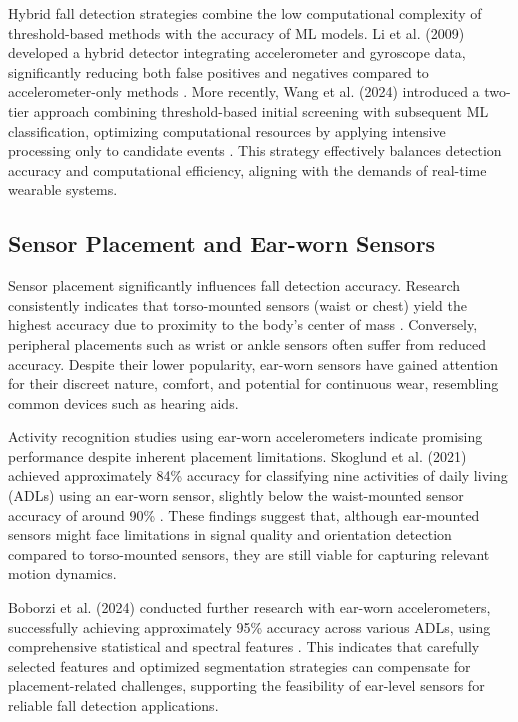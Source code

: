 \documentclass[conference]{IEEEtran}
\begin{document}
Hybrid fall detection strategies combine the low computational complexity of threshold-based methods with the accuracy of ML models. Li et al. (2009) developed a hybrid detector integrating accelerometer and gyroscope data, significantly reducing both false positives and negatives compared to accelerometer-only methods \cite{4}. More recently, Wang et al. (2024) introduced a two-tier approach combining threshold-based initial screening with subsequent ML classification, optimizing computational resources by applying intensive processing only to candidate events \cite{5}. This strategy effectively balances detection accuracy and computational efficiency, aligning with the demands of real-time wearable systems.

\subsection{Sensor Placement and Ear-worn Sensors}

Sensor placement significantly influences fall detection accuracy. Research consistently indicates that torso-mounted sensors (waist or chest) yield the highest accuracy due to proximity to the body's center of mass \cite{8}. Conversely, peripheral placements such as wrist or ankle sensors often suffer from reduced accuracy. Despite their lower popularity, ear-worn sensors have gained attention for their discreet nature, comfort, and potential for continuous wear, resembling common devices such as hearing aids.

Activity recognition studies using ear-worn accelerometers indicate promising performance despite inherent placement limitations. Skoglund et al. (2021) achieved approximately 84\% accuracy for classifying nine activities of daily living (ADLs) using an ear-worn sensor, slightly below the waist-mounted sensor accuracy of around 90\% \cite{9}. These findings suggest that, although ear-mounted sensors might face limitations in signal quality and orientation detection compared to torso-mounted sensors, they are still viable for capturing relevant motion dynamics.

Boborzi et al. (2024) conducted further research with ear-worn accelerometers, successfully achieving approximately 95\% accuracy across various ADLs, using comprehensive statistical and spectral features \cite{11}. This indicates that carefully selected features and optimized segmentation strategies can compensate for placement-related challenges, supporting the feasibility of ear-level sensors for reliable fall detection applications.
\end{document}
